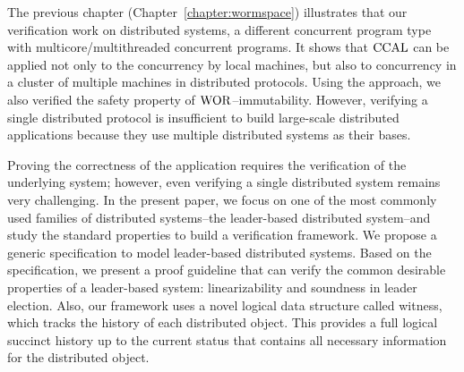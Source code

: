 The previous chapter (Chapter~\ref{chapter:wormspace})
illustrates that our verification work on distributed systems, 
a different concurrent program type with multicore/multithreaded concurrent programs. 
It shows that $\mathrm{CCAL}$ can be applied not only to the concurrency by local machines, but also to concurrency in a cluster of multiple machines in distributed protocols. Using the approach, we also verified the safety property of $\mathrm{WOR}$--immutability. 
However, verifying a single distributed protocol is insufficient to build large-scale distributed applications because they use multiple distributed systems as their bases.


Proving the correctness of the application requires the verification of the underlying system;
 however, even verifying a single distributed system remains very challenging. 
 In the present paper, we focus on one of the most commonly used families of distributed systems--the leader-based distributed system--and study the standard properties to build a verification framework.
  We propose a generic specification to model leader-based distributed systems. 
  Based on the specification, we present a proof guideline that can verify the common desirable properties of a leader-based system: linearizability and soundness in leader election. 
  Also, our framework uses a novel logical data structure called witness, which tracks the history of each distributed object. 
  This provides a full logical succinct history up to the current status that contains all necessary information for the distributed object.
